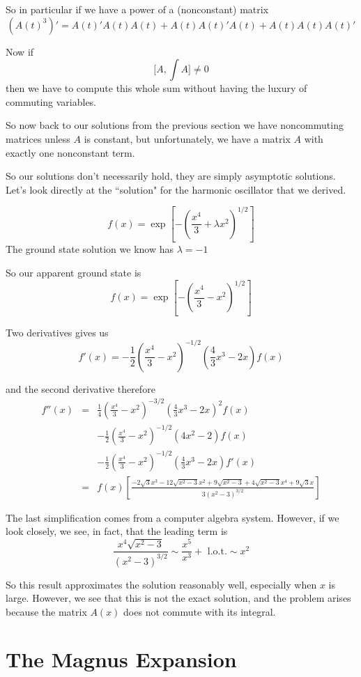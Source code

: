 \documentclass{amsart}
\theoremstyle{definition}
\theoremstyle{remark}
\numberwithin{equation}{section}
\begin{document}
So in particular if we have a power of a (nonconstant) matrix
\[
(A(t)^3)' = A(t)'A(t)A(t) + A(t)A(t)'A(t) + A(t)A(t)A(t)'
\]

Now if 
\[
\lbrack A , \int A \rbrack \ne 0 
\]
then we have to compute this whole sum without having the luxury of commuting variables.

So now back to our solutions from the previous section we have noncommuting matrices unless $A$ is constant, but unfortunately, we have a matrix $A$ with exactly one nonconstant term.

So our solutions don't necessarily hold, they are simply asymptotic solutions.  Let's look directly at the ``solution" for the harmonic oscillator that we derived.

\[
f(x) = \exp\left[-\left(\frac{x^4}{3} +\lambda x^2\right)^{1/2}\right]
\]
The ground state solution we know has $\lambda = -1$

So our apparent ground state is
\[
f(x) = \exp\left[-\left(\frac{x^4}{3} - x^2\right)^{1/2}\right]
\]

Two derivatives gives us
\[
f'(x) = -\frac{1}{2}\left(\frac{x^4}{3}-x^2\right)^{-1/2}\left(\frac{4}{3}x^3 - 2x\right) f(x)
\]

and the second derivative therefore
\begin{eqnarray*}
f''(x) &=& \frac{1}{4}\left(\frac{x^4}{3}-x^2\right)^{-3/2}\left(\frac{4}{3}x^3-2x\right)^2 f(x)\\  & &-\frac{1}{2}\left(\frac{x^4}{3}-x^2\right)^{-1/2}\left(4x^2 - 2\right) f(x)\\
 & &-\frac{1}{2}\left(\frac{x^4}{3}-x^2\right)^{-1/2}\left(\frac{4}{3}x^3 - 2x\right) f'(x)\\
 & = & f(x)\left[\frac{-2 \sqrt{3} x^3-12 \sqrt{x^2-3} x^2+9 \sqrt{x^2-3}+4 \sqrt{x^2-3} x^4+9 \sqrt{3} x}{3 (x^2-3)^{3/2}}\right]
\end{eqnarray*}

The last simplification comes from a computer algebra system.  However, if we look closely, we see, in fact, that the leading term is 
\[
\frac{x^4\sqrt{x^2-3}}{(x^2-3)^{3/2}} \sim \frac{x^5}{x^3} + \text{ l.o.t.} \sim x^2
\]

So this result approximates the solution reasonably well, especially when $x$ is large.  However, we see that this is not the exact solution, and the problem arises because the matrix $A(x)$ does not commute with its integral.


\section{The Magnus Expansion}
\end{document}
